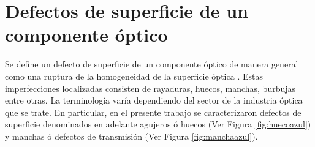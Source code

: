\singlespacing
\section{Defectos de superficie de un componente óptico}
\label{sec:defectsurf}

\hspace{0.5cm}Se define un defecto de superficie de un componente óptico de manera general como una ruptura de la homogeneidad de la superficie óptica \cite{Gomez_1998}. Estas imperfecciones localizadas consisten de rayaduras, huecos, manchas, burbujas entre otras. La terminología varía dependiendo del sector de la industria óptica que se trate. En particular, en el presente trabajo se caracterizaron defectos de superficie denominados en adelante agujeros ó huecos (Ver Figura \ref{fig:huecoazul}) y manchas ó defectos de transmisión (Ver Figura \ref{fig:manchaazul}).  

\begin{figure}[H]
	\begin{floatrow}
	\end{floatrow}
\end{figure}

